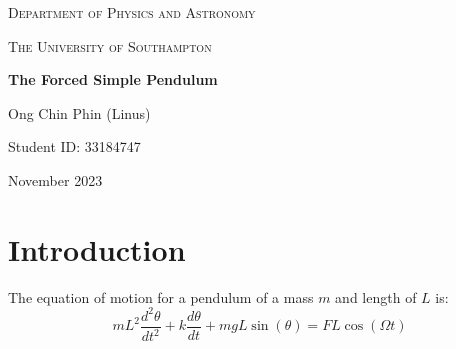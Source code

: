 \documentclass[12pt]{article}
\begin{document}
\begin{titlepage}
    \centering
    \vspace{1cm}
    {\scshape\Large Department of Physics and Astronomy \par}
    \vspace{1cm}
    {\scshape\Large The University of Southampton \par}
    \vspace{1cm}
    \vspace{1cm}
    {\huge\bfseries The Forced Simple Pendulum \par}
    \vspace{1cm}
    {\Large Ong Chin Phin (Linus) \par}
    \vspace{1cm}
    {\Large Student ID: 33184747 \par}
    \vfill
    {\large November 2023 \par}
\end{titlepage}

\newpage
\tableofcontents
\thispagestyle{empty}

\newpage
\thispagestyle{empty}
\begin{abstract}

\end{abstract}


\newpage
\setcounter{page}{1}
\section{Introduction}

The equation of motion for a pendulum of a mass $m$ and length of $L$ is:
\begin{equation}
    mL^2 \frac{d^2\theta}{dt^2} + k \frac{d\theta}{dt} + mgL\sin({\theta}) = FL\cos({\Omega}t)
    \label{oscillation}
\end{equation}
\end{document}
